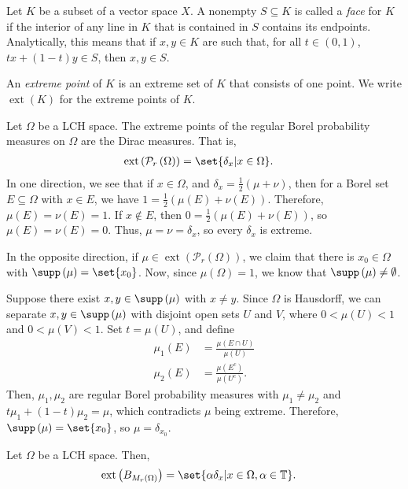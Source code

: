 \documentclass[10pt]{mypackage}
\begin{document}
\begin{definition}
  Let $K$ be a subset of a vector space $X$. A nonempty $S\subseteq K$ is called a \textit{face} for $K$ if the interior of any line in $K$ that is contained in $S$ contains its endpoints. Analytically, this means that if $x,y\in K$ are such that, for all $t\in (0,1)$, $tx + \left( 1-t \right)y\in S$, then $x,y\in S$.\newline

  An \textit{extreme point} of $K$ is an extreme set of $K$ that consists of one point. We write $\operatorname{ext}\left( K \right)$ for the extreme points of $K$.
\end{definition}
\begin{example}
  Let $\Omega$ be a LCH space. The extreme points of the regular Borel probability measures on $\Omega$ are the Dirac measures. That is,
  \begin{align*}
    \operatorname{ext}\left( \mathcal{P}_{r}\left( \Omega \right) \right) &= \set{\delta_x | x\in\Omega}.
  \end{align*}
  In one direction, we see that if $x\in \Omega$, and $\delta_x = \frac{1}{2}\left( \mu + \nu \right)$, then for a Borel set $E\subseteq \Omega$ with $x\in E$, we have $1 = \frac{1}{2}\left( \mu\left( E \right) + \nu\left( E \right) \right)$. Therefore, $\mu(E)=\nu(E) = 1$. If $x\notin E$, then $0 = \frac{1}{2}\left( \mu\left( E \right) + \nu\left( E \right) \right)$, so $\mu(E) = \nu(E) = 0$. Thus, $\mu=\nu=\delta_x$, so every $\delta_x$ is extreme.\newline

  In the opposite direction, if $\mu\in \operatorname{ext}\left( \mathcal{P}_r\left( \Omega \right) \right)$, we claim that there is $x_0\in \Omega$ with $\supp\left( \mu \right) = \set{x_0}$. Now, since $\mu\left( \Omega \right) = 1$, we know that $\supp\left( \mu \right) \neq\emptyset$.\newline

  Suppose there exist $x,y\in \supp\left( \mu \right)$ with $x\neq y$. Since $\Omega$ is Hausdorff, we can separate $x,y\in \supp\left( \mu \right)$ with disjoint open sets $U$ and $V$, where $0 < \mu\left( U \right) < 1$ and $0 < \mu\left( V \right) < 1$. Set $t = \mu\left( U \right)$, and define
  \begin{align*}
    \mu_1\left( E \right) &= \frac{\mu\left( E\cap U \right)}{\mu\left( U \right)}\\
    \mu_2\left( E \right) &= \frac{\mu\left( E^{c} \right)}{\mu\left( U^{c} \right)}.
  \end{align*}
  Then, $\mu_1,\mu_2$ are regular Borel probability measures with $\mu_1\neq \mu_2$ and $t\mu_1 + \left( 1-t \right)\mu_2 = \mu$, which contradicts $\mu$ being extreme. Therefore, $\supp\left( \mu \right) = \set{x_0}$, so $\mu = \delta_{x_0}$.
\end{example}
\begin{example}
  Let $\Omega$ be a LCH space. Then,
  \begin{align*}
    \operatorname{ext}\left( B_{M_r\left( \Omega \right)} \right) &= \set{\alpha\delta_x | x\in\Omega,\alpha\in \mathbb{T}}.
  \end{align*}
\end{example}
\end{document}
